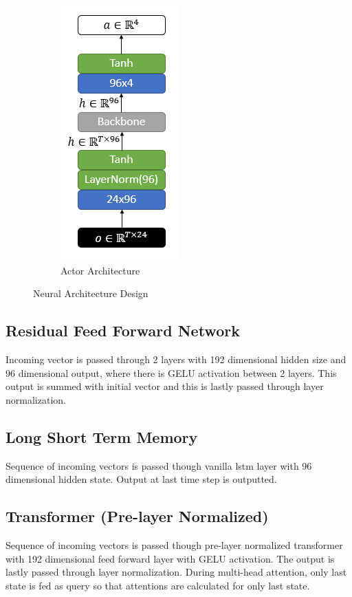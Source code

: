 \begin{figure}
\begin{subfigure}{.5\textwidth}
		\includegraphics[width=0.55\linewidth]{figures/nets/actor.png}
		\caption{Actor Architecture}
		\label{fig:actor_net}
	\end{subfigure}
	\caption{Neural Architecture Design}
	\label{fig:nets}
\end{figure}
\subsection{Residual Feed Forward Network}
Incoming vector is passed through 2 layers with 192 dimensional hidden size and 96 dimensional output, where there is GELU activation between 2 layers. This output is summed with initial vector and this is lastly passed through layer normalization. \\
\subsection{Long Short Term Memory}
Sequence of incoming vectors is passed though vanilla lstm layer with 96 dimensional hidden state. Output at last time step is outputted. \\
\subsection{Transformer (Pre-layer Normalized)}
Sequence of incoming vectors is passed though pre-layer normalized transformer with 192 dimensional feed forward layer with GELU activation. The output is lastly passed through layer normalization. During multi-head attention, only last state is fed as query so that attentions are calculated for only last state. \\
